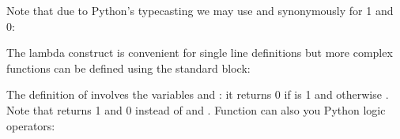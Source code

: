 \documentclass[letterpaper,10pt,english]{sphinxmanual}
\begin{document}
\begin{sphinxVerbatim}[commandchars=\\\{\}]
    \PYG{p}{[}\PYG{p}{]}
\end{sphinxVerbatim}

Note that due to Python’s typecasting we may use  and  synonymously for 1 and 0:

\begin{sphinxVerbatim}[commandchars=\\\{\}]
   
\end{sphinxVerbatim}

The lambda construct is convenient for single line definitions but more complex functions can be defined using the standard  block:

\begin{sphinxVerbatim}[commandchars=\\\{\}]
 
     
         
    
         \PYG{p}{[}\PYG{p}{]}  
\end{sphinxVerbatim}

The definition of  involves the variables  and : it returns 0 if  is 1 and otherwise .
Note that  returns 1 and 0 instead of  and .
Function can also you Python logic operators:
\end{document}
